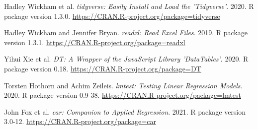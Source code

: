 \documentclass[
  11pt,
  bookmarksnumbered]{article}
\begin{document}
\begin{thebibliography}{99}

Hadley Wickham et al. \emph{tidyverse: Easily Install and Load the 'Tidyverse'}. 2020. R package version 1.3.0. \url{https://CRAN.R-project.org/package=tidyverse}

Hadley Wickham and Jennifer Bryan. \emph{readxl: Read Excel Files}. 2019. R package version 1.3.1. \url{https://CRAN.R-project.org/package=readxl}

Yihui Xie et al. \emph{DT: A Wrapper of the JavaScript Library 'DataTables'}. 2020. R package version 0.18. \url{https://CRAN.R-project.org/package=DT}

Torsten Hothorn and Achim Zeileis. \emph{lmtest: Testing Linear Regression Models}. 2020. R package version 0.9-38. \url{https://CRAN.R-project.org/package=lmtest}

John Fox et al. \emph{car: Companion to Applied Regression}. 2021. R package version 3.0-12. \url{https://CRAN.R-project.org/package=car}

\end{thebibliography}

\printbibliography
\end{document}
